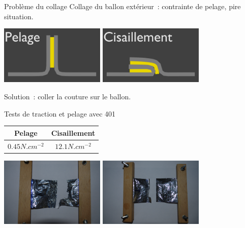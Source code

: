 \documentclass{beamer}
\begin{document}
\begin{frame}{Problème du collage}
  Collage du ballon extérieur~: contrainte de pelage, pire situation.
  \begin{center}
    \includegraphics[width=5cm]{../Images/colle_pelage.png}
    \includegraphics[width=5cm]{../Images/colle_cisaillement.png}
  \end{center}
  Solution~: coller la couture sur le ballon.
\end{frame}

\begin{frame}{Tests de traction et pelage avec 401}
   \begin{center}
    \begin{tabular}{|c|c|}
      \hline
      Pelage & Cisaillement \\
      \hline
      $0.45 N.cm^{-2}$ & $12.1 N.cm^{-2}$ \\
      \hline
    \end{tabular}
  \end{center}
  \begin{center}
    \includegraphics[width=5cm]{../Images/test_cisaillement.png}
    \includegraphics[width=5cm]{../Images/test_pelage.png}
  \end{center}
\end{frame}
\end{document}
